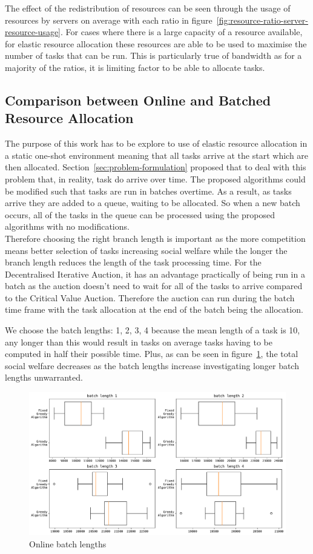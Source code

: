 The effect of the redistribution of resources can be seen through the usage of resources by servers on average with
each ratio in figure~\ref{fig:resource-ratio-server-resource-usage}. For cases where there is a large capacity of a
resource available, for elastic resource allocation these resources are able to be used to maximise the number of tasks
that can be run. This is particularly true of bandwidth as for a majority of the ratios, it is limiting factor to be
able to allocate tasks.

\subsection{Comparison between Online and Batched Resource Allocation}
\label{subsec:comparison-between-online-and-batched-resource-allocation}
The purpose of this work has to be explore to use of elastic resource allocation in a static one-shot environment
meaning that all tasks arrive at the start which are then allocated. Section~\ref{sec:problem-formulation} proposed
that to deal with this problem that, in reality, task do arrive over time. The proposed algorithms could be modified
such that tasks are run in batches overtime. As a result, as tasks arrive they are added to a queue, waiting to be
allocated. So when a new batch occurs, all of the tasks in the queue can be processed using the proposed algorithms
with no modifications. \\
Therefore choosing the right branch length is important as the more competition means better selection of tasks
increasing social welfare while the longer the branch length reduces the length of the task processing time. For the
Decentralised Iterative Auction, it has an advantage practically of being run in a batch as the auction doesn't need to
wait for all of the tasks to arrive compared to the Critical Value Auction. Therefore the auction can run during the
batch time frame with the task allocation at the end of the batch being the allocation.

We choose the batch lengths: 1, 2, 3, 4 because the mean length of a task is 10, any longer than this would result in
tasks on average tasks having to be computed in half their possible time. Plus, as can be seen in
figure~\ref{fig:batch-task-allocation}, the total social welfare decreases as the batch lengths increase investigating
longer batch lengths unwarranted.

\begin{figure}
    \centering
    \includegraphics[width=\linewidth]{figs/online/online_batch_lengths.pdf}
    \caption{Online batch lengths}
    \label{fig:batch-task-allocation}
\end{figure}